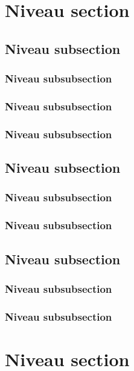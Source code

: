 \documentclass[12pt]{report}
\begin{document}
\section{Niveau section}

\subsection{Niveau subsection}

\subsubsection{Niveau subsubsection}

\subsubsection{Niveau subsubsection}

\subsubsection{Niveau subsubsection}

\subsection{Niveau subsection}

\subsubsection{Niveau subsubsection}

\subsubsection{Niveau subsubsection}

\subsection{Niveau subsection}

\subsubsection{Niveau subsubsection}

\subsubsection{Niveau subsubsection}

\section{Niveau section}
\end{document}
